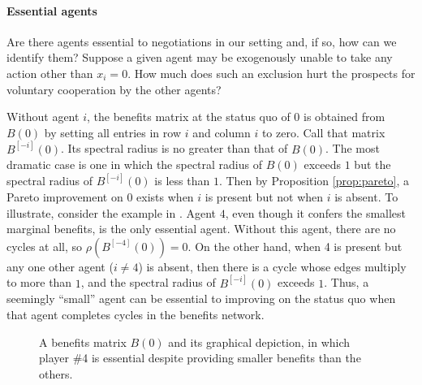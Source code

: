 \documentclass{notices}
\theoremstyle{definition}\newtheorem{problem}{Problem}
\theoremstyle{definition} \newtheorem{remark}{Remark}
\theoremstyle{definition} \newtheorem{claim}{Claim}
\theoremstyle{definition} \newtheorem{thm}{Theorem}
\theoremstyle{definition} \newtheorem*{thmNoNum}{Theorem}
\theoremstyle{definition} \newtheorem{definition}{Definition}
\theoremstyle{definition} \theoremstyle{remark}
\theoremstyle{definition} \newtheorem{note}{Note}
\theoremstyle{definition} \newtheorem{notation}{Notation}
\theoremstyle{definition} \theoremstyle{plain}
\theoremstyle{definition} \newtheorem{condition}{Condition}
\theoremstyle{definition} \newtheorem{lem}{Lemma}
\theoremstyle{definition} \newtheorem{corollary}{Corollary}
\theoremstyle{definition} \newtheorem{prop}{Proposition}
\theoremstyle{definition} \newtheorem{ax}{Axiom}
\theoremstyle{definition} \newtheorem{assumption}{Assumption}
\theoremstyle{definition} \newtheorem{example}{Example}
\theoremstyle{definition} \newtheorem{rmk}{Remark}
\theoremstyle{definition} \newtheorem{res}{Result}
\theoremstyle{definition} \newtheorem{que}{Question}
\theoremstyle{definition} \newtheorem{conjecture}{Conjecture}
\theoremstyle{definition}
\begin{document}
\paragraph{Essential agents}




Are there agents essential to negotiations in our setting and, if so, how can we identify them? Suppose a given agent may be exogenously unable to take any action other than $x_i=0$. How much does such an exclusion hurt the prospects for voluntary cooperation by the other agents?


Without agent $i$, the benefits matrix at the status quo of ${0}$ is obtained from ${B}({0})$ by setting all entries in row $i$ and column $i$ to zero. Call that matrix ${B}^{[-i]}({0})$. Its spectral radius is no greater than that of ${B}({0})$. The most dramatic case is one in which the spectral radius of ${B}({0})$ exceeds $1$ but the spectral radius of ${B}^{[-i]}({0})$ is less than $1$. Then by Proposition \ref{prop:pareto}, a Pareto improvement on ${0}$ exists when $i$ is present but not when $i$ is absent. To illustrate, consider the example in . Agent $4$, even though it confers the smallest marginal benefits, is the only essential agent. Without this agent, there are no cycles at all, so $\rho({B}^{[-4]}({0}))=0$. On the other hand, when 4 is present but any one other agent ($i \neq 4$) is absent, then there is a cycle whose edges multiply to more than $1$, and the spectral radius of ${B}^{[-i]}({0})$ exceeds $1$. Thus, a seemingly ``small'' agent can be essential to improving on the status quo when that agent completes cycles in the benefits network.




\begin{figure}[t]
\centering
{}
\caption{A benefits matrix ${B}({0})$ and its graphical depiction, in which player \#4 is essential despite providing smaller benefits than the others.}
\label{fig:three-cycle-2}
\end{figure}
\end{document}
